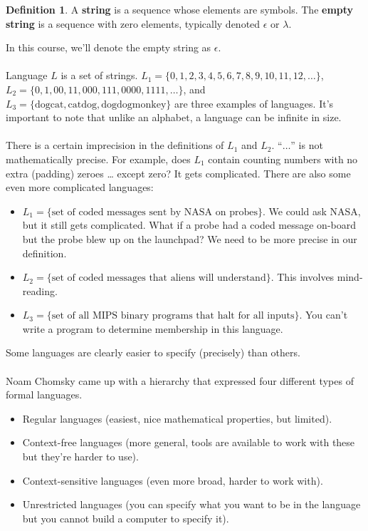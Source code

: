 \documentclass[]{article}
\theoremstyle{definition}
\newtheorem{defn}{Definition}[section]
\begin{document}
		\begin{defn}
			A \textbf{string} is a sequence whose elements are symbols. The \textbf{empty string} is a sequence with zero elements, typically denoted $\epsilon$ or $\lambda$.
		\end{defn}
		In this course, we'll denote the empty string as $\epsilon$.
		\\ \\
		Language $L$ is a set of strings. $L_1 = \{ 0, 1, 2, 3, 4, 5, 6, 7, 8, 9, 10, 11, 12, \ldots \}$, $L_2 = \{0, 1, 00, 11, 000, 111, 0000, 1111, \ldots\}$, and $L_3 = \{ \text{dogcat}, \text{catdog}, \text{dogdogmonkey} \}$ are three examples of languages. It's important to note that unlike an alphabet, a language can be infinite in size.
		\\ \\
		There is a certain imprecision in the definitions of $L_1$ and $L_2$. ``$\ldots$'' is not mathematically precise. For example, does $L_1$ contain counting numbers with no extra (padding) zeroes \ldots{} except zero? It gets complicated. There are also some even more complicated languages:
		\begin{itemize}
			\item $L_1 = \{ \text{set of coded messages sent by NASA on probes} \}$. We could ask NASA, but it still gets complicated. What if a probe had a coded message on-board but the probe blew up on the launchpad? We need to be more precise in our definition.
			\item $L_2 = \{ \text{set of coded messages that aliens will understand} \}$. This involves mind-reading.
			\item $L_3 = \{ \text{set of all MIPS binary programs that halt for all inputs} \}$. You can't write a program to determine membership in this language.
		\end{itemize}
		Some languages are clearly easier to specify (precisely) than others.
		\\ \\	
		Noam Chomsky came up with a hierarchy that expressed four different types of formal languages.
		\begin{itemize}
			\item Regular languages (easiest, nice mathematical properties, but limited).
			\item Context-free languages (more general, tools are available to work with these but they're harder to use).
			\item Context-sensitive languages (even more broad, harder to work with).
			\item Unrestricted languages (you can specify what you want to be in the language but you cannot build a computer to specify it).
		\end{itemize}
\end{document}
